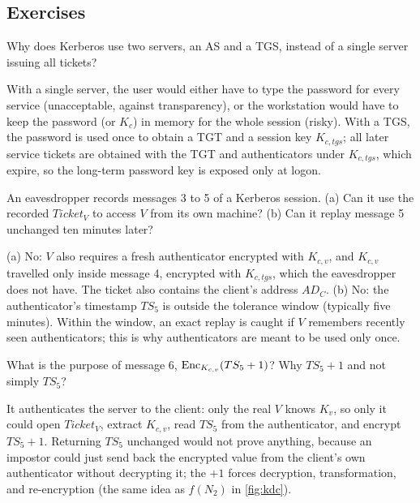 \subsection*{Exercises}

\begin{exercise}
Why does Kerberos use two servers, an AS and a TGS, instead of a single server issuing all tickets?
\end{exercise}
\begin{solution}
With a single server, the user would either have to type the password for every service (unacceptable, against transparency), or the workstation would have to keep the password (or $K_c$) in memory for the whole session (risky). With a TGS, the password is used once to obtain a TGT and a session key $K_{c,tgs}$; all later service tickets are obtained with the TGT and authenticators under $K_{c,tgs}$, which expire, so the long-term password key is exposed only at logon.
\end{solution}

\begin{exercise}
An eavesdropper records messages 3 to 5 of a Kerberos session. (a) Can it use the recorded $\mathit{Ticket}_V$ to access $V$ from its own machine? (b) Can it replay message 5 unchanged ten minutes later?
\end{exercise}
\begin{solution}
(a) No: $V$ also requires a fresh authenticator encrypted with $K_{c,v}$, and $K_{c,v}$ travelled only inside message 4, encrypted with $K_{c,tgs}$, which the eavesdropper does not have. The ticket also contains the client's address $AD_C$. (b) No: the authenticator's timestamp $TS_5$ is outside the tolerance window (typically five minutes). Within the window, an exact replay is caught if $V$ remembers recently seen authenticators; this is why authenticators are meant to be used only once.
\end{solution}

\begin{exercise}
What is the purpose of message 6, $\operatorname{Enc}_{K_{c,v}}(TS_5 + 1)$? Why $TS_5 + 1$ and not simply $TS_5$?
\end{exercise}
\begin{solution}
It authenticates the server to the client: only the real $V$ knows $K_v$, so only it could open $\mathit{Ticket}_V$, extract $K_{c,v}$, read $TS_5$ from the authenticator, and encrypt $TS_5 + 1$. Returning $TS_5$ unchanged would not prove anything, because an impostor could just send back the encrypted value from the client's own authenticator without decrypting it; the $+1$ forces decryption, transformation, and re-encryption (the same idea as $f(N_2)$ in \cref{fig:kdc}).
\end{solution}


